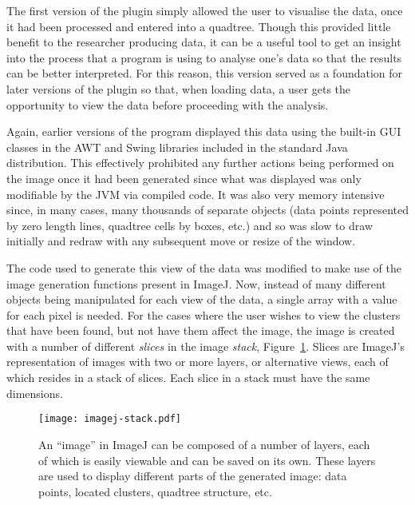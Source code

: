The first version of the plugin simply allowed the user to visualise the data,
once it had been processed and entered into a quadtree. Though this provided
little benefit to the researcher producing data, it can be a useful tool to get
an insight into the process that a program is using to analyse one's data so
that the results can be better interpreted. For this reason, this version
served as a foundation for later versions of the plugin so that, when loading
data, a user gets the opportunity to view the data before proceeding with the
analysis.

Again, earlier versions of the program displayed this data using the built-in
GUI classes in the AWT\cite{zukowski1997java} and Swing\cite{loy2002java}
libraries included in the standard Java distribution. This effectively
prohibited any further actions being performed on the image once it had been
generated since what was displayed was only modifiable by the JVM via compiled
code. It was also very memory intensive since, in many cases, many thousands of
separate objects (data points represented by zero length lines, quadtree cells
by boxes, etc.) and so was slow to draw initially and redraw with any
subsequent move or resize of the window.

The code used to generate this view of the data was modified to make use of the
image generation functions present in ImageJ. Now, instead of many different
objects being manipulated for each view of the data, a single array with a
value for each pixel is needed. For the cases where the user wishes to view the
clusters that have been found, but not have them affect the image, the image is
created with a number of different \emph{slices} in the image \emph{stack},
Figure~\ref{fig:imagej-stack}. Slices are ImageJ's representation of images
with two or more layers, or alternative views, each of which resides in a stack
of slices. Each slice in a stack must have the same dimensions.

\begin{figure}[tbhp]
	\centering
	\texttt{[image: imagej-stack.pdf]}

	\caption[Layers in ImageJ image representation.]{An ``image'' in ImageJ can
		be composed of a number of layers, each of which is easily viewable and
		can be saved on its own. These layers are used to display different
		parts of the generated image: data points, located clusters, quadtree
		structure, etc.}\label{fig:imagej-stack}
\end{figure}

